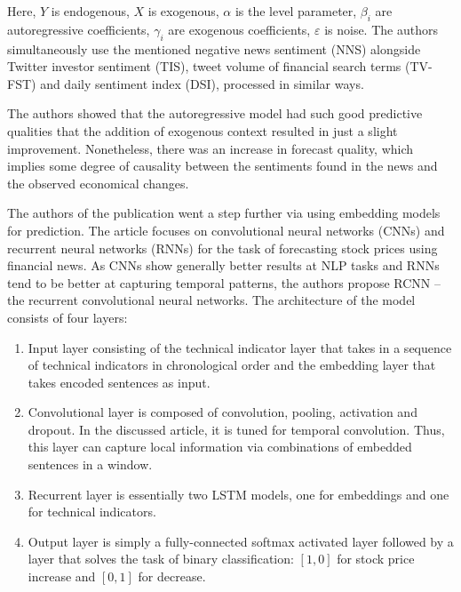\documentclass[3p,times,procedia]{elsarticle}
\begin{document}
Here, $Y$ is endogenous, $X$ is exogenous, $\alpha$ is the level parameter, $\beta_i$ are autoregressive coefficients, $\gamma_i$ are exogenous coefficients, $\varepsilon$ is noise. The authors simultaneously use the mentioned negative news sentiment (NNS) alongside Twitter investor sentiment (TIS), tweet volume of financial search terms (TV-FST) and daily sentiment index (DSI), processed in similar ways.

The authors showed that the autoregressive model had such good predictive qualities that the addition of exogenous context resulted in just a slight improvement. Nonetheless, there was an increase in forecast quality, which implies some degree of causality between the sentiments found in the news and the observed economical changes. 

The authors of the publication \cite{vargas2017deep} went a step further via using embedding models for prediction. The article focuses on convolutional neural networks (CNNs) and recurrent neural networks (RNNs) for the task of forecasting stock prices using financial news. As CNNs show generally better results at NLP tasks and RNNs tend to be better at capturing temporal patterns, the authors propose RCNN -- the recurrent convolutional neural networks. The architecture of the model consists of four layers:
\begin{enumerate}
	\item Input layer consisting of the technical indicator layer that takes in a sequence of technical indicators in chronological order and the embedding layer that takes encoded sentences as input.
	\item Convolutional layer is composed of convolution, pooling, activation and dropout. In the discussed article, it is tuned for temporal convolution. Thus, this layer can capture local information via combinations of embedded sentences in a window.
	\item Recurrent layer is essentially two LSTM models, one for embeddings and one for technical indicators.
	\item Output layer is simply a fully-connected softmax activated layer followed by a layer that solves the task of binary classification: $[1,0]$ for stock price increase and $[0,1]$ for decrease. 
\end{enumerate}
\end{document}
